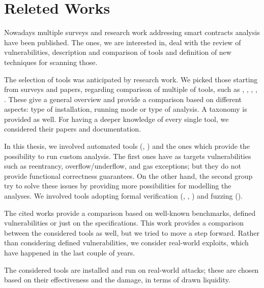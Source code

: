 \section{Releted Works}
\label{sec:Introduction:ReletedWorks}
Nowadays multiple surveys and research work addressing smart contracts analysis have been published. 
The ones, we are interested in, deal with the review of vulnerabilities, description and comparison of tools and definition of new techniques for scanning those. 

The selection of tools was anticipated by research work. 
We picked those starting from surveys and papers, 
regarding comparison of multiple of tools, such as \citet{Survey1}, \citet{Survey2}, \citet{Survey3}, \citet{Survey4}, \citet{thesis}. 
These give a general overview and provide a comparison based on different aspects: type of installation, running mode or type of analysis. 
A taxonomy is provided as well. 
For having a deeper knowledge of every single tool, we considered their papers and documentation.

In this thesis, we involved automated tools (\citet{Slither}, \citet {Mythril}) and the ones which provide the possibility to run custom analysis.
The first ones have as targets vulnerabilities such as reentrancy, overflow/underflow, and gas exceptions; but they do not provide functional correctness guarantees. 
On the other hand, the second group try to solve these issues by providing more possibilities for modelling the analyses. 
We involved tools adopting formal verification (\citet{CertoraDocumentation}, \citet{SolcVerify}, \citet{CelestialPaper}) and fuzzing (\citet{Echidna}). 

The cited works provide a comparison based on well-known benchmarks, defined vulnerabilities or just on the specifications.
This work provides a comparison between the considered tools as well, 
but we tried to move a step forward.
Rather than considering defined vulnerabilities, we consider real-world exploits, which have happened in the last couple of years.

The considered tools are installed and run on real-world attacks; these are chosen based on their effectiveness and the damage, in terms of drawn liquidity.